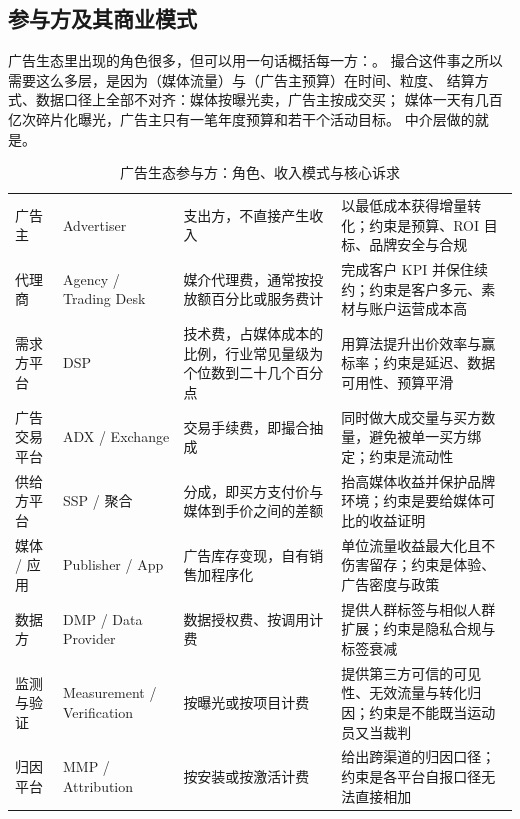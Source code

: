 \subsection{参与方及其商业模式}

广告生态里出现的角色很多，但可以用一句话概括每一方：。
撮合这件事之所以需要这么多层，是因为（媒体流量）与（广告主预算）在时间、粒度、
结算方式、数据口径上全部不对齐：媒体按曝光卖，广告主按成交买；
媒体一天有几百亿次碎片化曝光，广告主只有一笔年度预算和若干个活动目标。
中介层做的就是。

\begin{table}[htbp]
\centering
\caption{广告生态参与方：角色、收入模式与核心诉求}
\label{tab:ad-players}
\small
\begin{tabularx}{\textwidth}{L{2.2cm} L{2.4cm} L{3.4cm} Y}
\toprule
{} &  &  &  \\
\midrule
广告主 & Advertiser & 支出方，不直接产生收入 & 以最低成本获得增量转化；约束是预算、ROI 目标、品牌安全与合规 \\
\addlinespace
代理商 & Agency / Trading Desk & 媒介代理费，通常按投放额百分比或服务费计 & 完成客户 KPI 并保住续约；约束是客户多元、素材与账户运营成本高 \\
\addlinespace
需求方平台 & DSP & 技术费，占媒体成本的比例，行业常见量级为个位数到二十几个百分点 & 用算法提升出价效率与赢标率；约束是延迟、数据可用性、预算平滑 \\
\addlinespace
广告交易平台 & ADX / Exchange & 交易手续费，即撮合抽成 & 同时做大成交量与买方数量，避免被单一买方绑定；约束是流动性 \\
\addlinespace
供给方平台 & SSP / 聚合 & 分成，即买方支付价与媒体到手价之间的差额 & 抬高媒体收益并保护品牌环境；约束是要给媒体可比的收益证明 \\
\addlinespace
媒体 / 应用 & Publisher / App & 广告库存变现，自有销售加程序化 & 单位流量收益最大化且不伤害留存；约束是体验、广告密度与政策 \\
\addlinespace
数据方 & DMP / Data Provider & 数据授权费、按调用计费 & 提供人群标签与相似人群扩展；约束是隐私合规与标签衰减 \\
\addlinespace
监测与验证 & Measurement / Verification & 按曝光或按项目计费 & 提供第三方可信的可见性、无效流量与转化归因；约束是不能既当运动员又当裁判 \\
\addlinespace
归因平台 & MMP / Attribution & 按安装或按激活计费 & 给出跨渠道的归因口径；约束是各平台自报口径无法直接相加 \\
\bottomrule
\end{tabularx}
\end{table}

